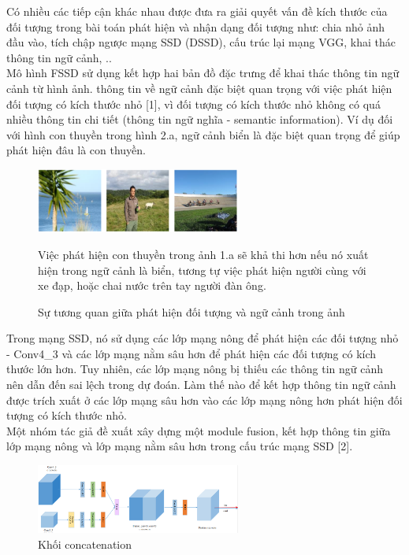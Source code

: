 \documentclass[a4paper]{report}
\begin{document}
Có nhiều các tiếp cận khác nhau được đưa ra giải quyết vấn đề kích thước của đối tượng trong bài toán phát hiện và nhận dạng đối tượng như: chia nhỏ ảnh đầu vào, tích chập ngược mạng SSD (DSSD), cấu trúc lại mạng VGG, khai thác thông tin ngữ cảnh, ..
\\

Mô hình FSSD sử dụng kết hợp hai bản đồ đặc trưng để khai thác thông tin ngữ cảnh từ hình ảnh. thông tin về ngữ cảnh đặc biệt quan trọng với việc phát hiện đối tượng có kích thước nhỏ [1], vì đối tượng có kích thước nhỏ không có quá nhiều thông tin chi tiết (thông tin ngữ nghĩa - semantic information). Ví dụ đối với hình con thuyền trong hình 2.a, ngữ cảnh biển là đặc biệt quan trọng để giúp phát hiện đâu là con thuyền.
\\

\begin{figure}[h!]
	\centering
	\includegraphics[width=0.6\textwidth]{3_contextual.png}
	\caption[Caption for LOF]{Sự tương quan giữa phát hiện đối tượng và ngữ cảnh trong ảnh}
	Việc phát hiện con thuyền trong ảnh 1.a sẽ khả thi hơn nếu nó xuất hiện trong ngữ cảnh là biển, tương tự việc phát hiện người cùng với xe đạp, hoặc chai nước trên tay người đàn ông. 
\end{figure}


Trong mạng SSD, nó sử dụng các lớp mạng nông để phát hiện các đối tượng nhỏ - Conv4\_3 và các lớp mạng nằm sâu hơn để phát hiện các đối tượng có kích thước lớn hơn. Tuy nhiên, các lớp mạng nông bị thiếu các thông tin ngữ cảnh nên dẫn đến sai lệch trong dự đoán. Làm thế nào để kết hợp thông tin ngữ cảnh được trích xuất ở các lớp mạng sâu hơn vào các lớp mạng nông hơn phát hiện đối tượng có kích thước nhỏ. 
\\

Một nhóm tác giả đề xuất xây dựng một module fusion, kết hợp thông tin giữa lớp mạng nông và lớp mạng nằm sâu hơn trong cấu trúc mạng SSD [2]. 
\cite{fssd}
\\

\begin{figure}[h!]
	\centering
	\includegraphics[width=0.6\textwidth]{3_fusion_module.png}
	\caption[Caption for LOF]{Khối concatenation}
\end{figure}
\end{document}
